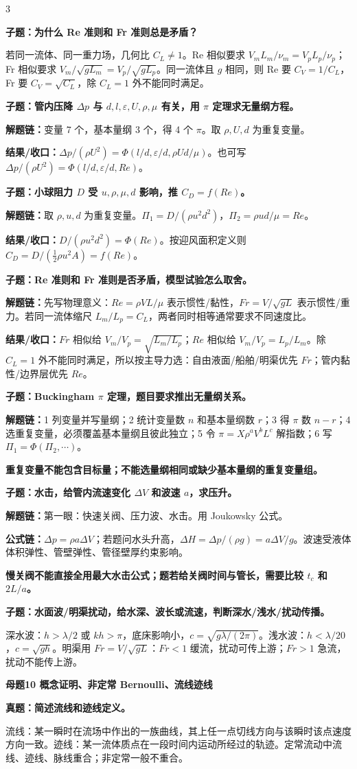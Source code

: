 \documentclass[a4paper]{article}
\newcommand{\mt}[1]{\vspace{2pt}\colorbox{M}{\parbox{\dimexpr\linewidth-2\fboxsep}{\color{white}\bfseries #1}}\par}
\newcommand{\qt}[1]{\vspace{1pt}\colorbox{Q}{\parbox{\dimexpr\linewidth-2\fboxsep}{\color{white}\bfseries #1}}\par}
\newcommand{\ans}[1]{\colorbox{G}{\parbox{\dimexpr\linewidth-2\fboxsep}{#1}}\par}
\newcommand{\warn}[1]{\colorbox{Y}{\parbox{\dimexpr\linewidth-2\fboxsep}{\color{E}\bfseries #1}}\par}
\newcommand{\chain}[1]{{\color{A}\bfseries 解题链：}#1\par}
\newcommand{\res}[1]{{\color{E}\bfseries 结果/收口：}#1\par}
\newcommand{\form}[1]{{\color{M}\bfseries 公式链：}#1\par}
\begin{document}
\begin{multicols}{3}
\qt{子题：为什么 Re 准则和 Fr 准则总是矛盾？}
\ans{若同一流体、同一重力场，几何比 $C_L\ne1$。Re 相似要求 $V_mL_m/\nu_m=V_pL_p/\nu_p$；Fr 相似要求 $V_m/\sqrt{gL_m}=V_p/\sqrt{gL_p}$。同一流体且 $g$ 相同，则 Re 要 $C_V=1/C_L$，Fr 要 $C_V=\sqrt{C_L}$，除 $C_L=1$ 外不能同时满足。}

\qt{子题：管内压降 $\Delta p$ 与 $d,l,\varepsilon,U,\rho,\mu$ 有关，用 $\pi$ 定理求无量纲方程。}
\chain{变量 7 个，基本量纲 3 个，得 4 个 $\pi$。取 $\rho,U,d$ 为重复变量。}
\res{$\Delta p/(\rho U^2)=\Phi(l/d,\varepsilon/d,\rho Ud/\mu)$。也可写 $\Delta p/(\rho U^2)=\Phi(l/d,\varepsilon/d,Re)$。}

\qt{子题：小球阻力 $D$ 受 $u,\rho,\mu,d$ 影响，推 $C_D=f(Re)$。}
\chain{取 $\rho,u,d$ 为重复变量。$\Pi_1=D/(\rho u^2d^2)$，$\Pi_2=\rho ud/\mu=Re$。}
\res{$D/(\rho u^2d^2)=\Phi(Re)$。按迎风面积定义则 $C_D=D/(\frac12\rho u^2A)=f(Re)$。}

\qt{子题：Re 准则和 Fr 准则是否矛盾，模型试验怎么取舍。}
\chain{先写物理意义：$Re=\rho VL/\mu$ 表示惯性/黏性，$Fr=V/\sqrt{gL}$ 表示惯性/重力。若同一流体缩尺 $L_m/L_p=C_L$，两者同时相等通常要求不同速度比。}
\res{$Fr$ 相似给 $V_m/V_p=\sqrt{L_m/L_p}$；$Re$ 相似给 $V_m/V_p=L_p/L_m$。除 $C_L=1$ 外不能同时满足，所以按主导力选：自由液面/船舶/明渠优先 $Fr$；管内黏性/边界层优先 $Re$。}

\qt{子题：Buckingham $\pi$ 定理，题目要求推出无量纲关系。}
\chain{1 列变量并写量纲；2 统计变量数 $n$ 和基本量纲数 $r$；3 得 $\pi$ 数 $n-r$；4 选重复变量，必须覆盖基本量纲且彼此独立；5 令 $\pi=X\rho^aV^bL^c$ 解指数；6 写 $\Pi_1=\Phi(\Pi_2,\cdots)$。}
\warn{重复变量不能包含目标量；不能选量纲相同或缺少基本量纲的重复变量组。}

\qt{子题：水击，给管内流速变化 $\Delta V$ 和波速 $a$，求压升。}
\chain{第一眼：快速关阀、压力波、水击。用 Joukowsky 公式。}
\form{$\Delta p=\rho a\Delta V$；若题问水头升高，$\Delta H=\Delta p/(\rho g)=a\Delta V/g$。波速受液体体积弹性、管壁弹性、管径壁厚约束影响。}
\warn{慢关阀不能直接全用最大水击公式；题若给关阀时间与管长，需要比较 $t_c$ 和 $2L/a$。}

\qt{子题：水面波/明渠扰动，给水深、波长或流速，判断深水/浅水/扰动传播。}
\ans{深水波：$h>\lambda/2$ 或 $kh>\pi$，底床影响小，$c=\sqrt{g\lambda/(2\pi)}$。浅水波：$h<\lambda/20$，$c=\sqrt{gh}$。明渠用 $Fr=V/\sqrt{gL}$：$Fr<1$ 缓流，扰动可传上游；$Fr>1$ 急流，扰动不能传上游。}

\mt{母题10 概念证明、非定常 Bernoulli、流线迹线}
\qt{真题：简述流线和迹线定义。}
\ans{流线：某一瞬时在流场中作出的一族曲线，其上任一点切线方向与该瞬时该点速度方向一致。迹线：某一流体质点在一段时间内运动所经过的轨迹。定常流动中流线、迹线、脉线重合；非定常一般不重合。}


\end{multicols}
\end{document}
